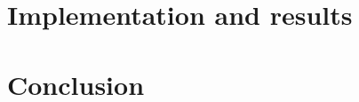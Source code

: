 \documentclass[a4paper]{article}
\begin{document}
\section{Implementation and results}\label{sec:implementation_and_results}



\section{Conclusion}\label{sec:conclusion}


%
%

{}
\end{document}
